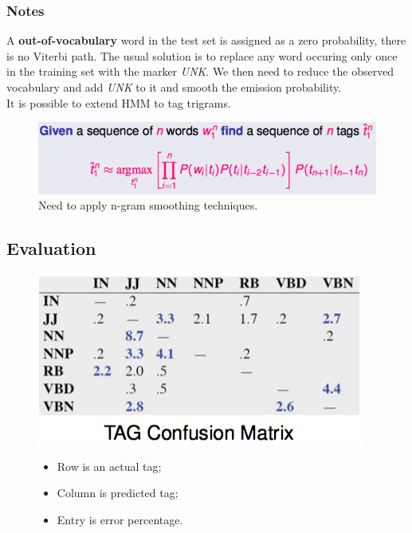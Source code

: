 \subsubsection{Notes}

A \textbf{out-of-vocabulary} word in the test set is assigned as a zero probability, there is no Viterbi path. The usual solution is to replace any word occuring only once in the training set with the marker \textit{UNK}. We then need to reduce the observed vocabulary and add \textit{UNK} to it and smooth the emission probability.\\

It is possible to extend HMM to tag trigrams.

\begin{figure}[H]
	\centering
	\includegraphics[scale=0.5]{images/39_trigrams.png}
 	\caption{Need to apply n-gram smoothing techniques.}
\end{figure}

\subsection{Evaluation}

\begin{figure}[H]
\centering
\begin{minipage}{.5\textwidth}
  \centering
  \includegraphics[scale=0.5]{images/40_matrix.png}
\end{minipage}%
\begin{minipage}{.5\textwidth}
  \centering
  \begin{itemize}
  	\item Row is an actual tag;
  	\item Column is predicted tag;
  	\item Entry is error percentage.
  \end{itemize}
\end{minipage}
\end{figure}

